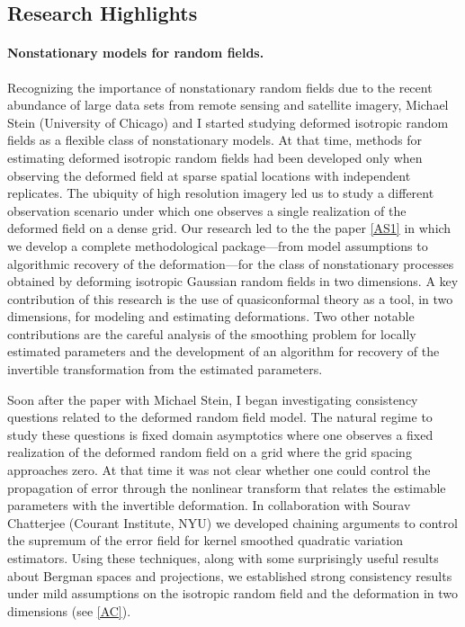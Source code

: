 \documentclass[12pt]{article}
\begin{document}
\subsection*{Research Highlights}



\paragraph{Nonstationary models for random fields.}
Recognizing the importance of nonstationary random fields due to the recent abundance of large data sets from remote sensing and satellite imagery, Michael Stein (University of Chicago) and I started studying deformed isotropic random fields as a flexible class of nonstationary models. At that time, methods for estimating deformed isotropic random fields had been developed only when observing the deformed field at sparse spatial locations  with independent replicates. The ubiquity of high resolution imagery led us to study a different observation scenario under which one observes a single realization of the deformed field on a dense grid. Our research led to the the paper \ref{AS1} in which we develop a complete
methodological package---from model assumptions to algorithmic recovery of the
deformation---for the class of nonstationary processes obtained by deforming
isotropic Gaussian random fields in two dimensions. A key contribution of this research is the use of quasiconformal theory as a tool, in two dimensions,  for modeling and estimating deformations. Two other notable contributions  are the careful analysis of the smoothing problem for locally estimated parameters and the development of an algorithm for recovery of the invertible transformation from the estimated parameters.

Soon after the paper with Michael Stein,
 I began investigating consistency questions related to the deformed random field model. The natural regime to study these questions is fixed domain asymptotics where one observes a fixed realization of the deformed random field on a grid where the grid spacing approaches zero. At that time it was not clear whether one could control the propagation of error through the nonlinear transform that relates the estimable parameters with the invertible deformation. In  collaboration with Sourav Chatterjee (Courant Institute, NYU) we developed chaining arguments to control the supremum of the error field for  kernel smoothed quadratic variation estimators. Using these techniques, along with some surprisingly useful results about Bergman spaces and projections, we  established strong consistency results under mild assumptions on the isotropic random field and the deformation in two dimensions (see \ref{AC}).
\end{document}
